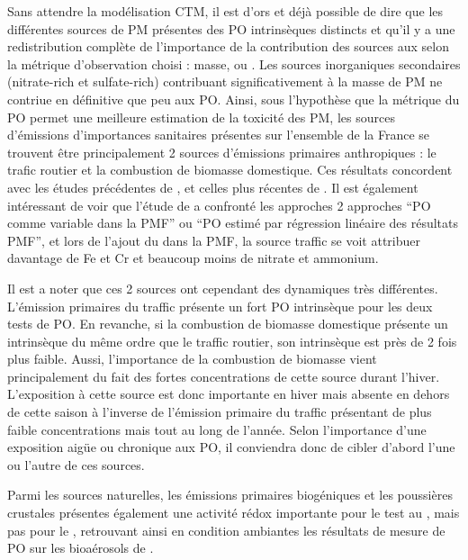 Sans attendre la modélisation CTM, il est d'ors et déjà possible de dire que les
différentes sources de PM présentes des PO intrinsèques distincts et qu'il y a une
redistribution complète de l'importance de la contribution des sources aux \PMdix{} selon
la métrique d'observation choisi : masse, \POAAv{} ou \PODTTv. Les sources inorganiques
secondaires (nitrate-rich et sulfate-rich) contribuant significativement à la masse de PM
ne contriue en définitive que peu aux PO. Ainsi, sous l'hypothèse que
la métrique du PO permet une meilleure estimation de la toxicité des PM, les sources
d'émissions d'importances sanitaires présentes sur l'ensemble de la France se trouvent être
principalement 2 sources d'émissions primaires anthropiques : le trafic routier et la
combustion de biomasse domestique. Ces résultats concordent avec les études précédentes de
\cite{batesReactive2015,fangOxidative2016}, et celles plus récentes de
\cite{paraskevopoulouYearlong2019,cesariSource2019}. Il est également intéressant de
voir que l'étude de \cite{cesariSource2019} a confronté les approches 2 approches ``PO comme variable
dans la PMF'' ou ``PO estimé par régression linéaire des résultats PMF'', et lors
de l'ajout du \PODTTv{} dans la PMF, la source traffic se voit attribuer davantage de Fe
et Cr et beaucoup moins de nitrate et ammonium.

Il est a noter que ces 2 sources ont cependant des dynamiques très différentes. L'émission
primaires du traffic présente un fort PO intrinsèque pour les deux tests de PO.
En revanche, si la combustion de biomasse domestique présente un \POAA{} intrinsèque du
même ordre que le traffic routier, son \PODTT{} intrinsèque est près de 2 fois plus
faible. Aussi, l'importance de la combustion de biomasse vient principalement du fait des
fortes concentrations de cette source durant l'hiver. L'exposition à cette source est donc
importante en hiver mais absente en dehors de cette saison à l'inverse de l'émission
primaire du traffic présentant de plus faible concentrations mais tout au long de l'année.
Selon l'importance d'une exposition aigüe ou chronique aux PO, il conviendra donc de
cibler d'abord l'une ou l'autre de ces sources.

Parmi les sources naturelles, les émissions primaires biogéniques et les poussières
crustales présentes également une activité rédox importante pour le test au \PODTT, mais
pas pour le \POAA, retrouvant ainsi en condition ambiantes les résultats de mesure de PO
sur les bioaérosols de \cite{samakeUnexpected2017}.

